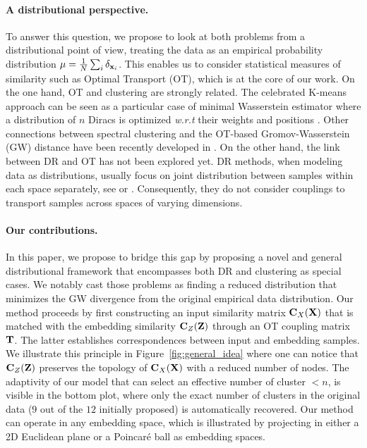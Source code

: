 \paragraph{A distributional perspective.} To answer this question, we
propose to look at both problems from a distributional point of view, treating the data as an empirical probability distribution
$\mu=\frac{1}{N}\sum_i\delta_{{\mathbf{x}}_i}$. 
This enables us to consider statistical measures of similarity such as Optimal Transport (OT), which is at the core of our work.
On the one hand, OT and clustering are strongly related.
The celebrated K-means approach can be seen as a particular case of minimal Wasserstein estimator where a distribution of $n$ Diracs is optimized \textit{w.r.t} their weights and positions \cite{Canas12}. Other connections between spectral clustering and the OT-based Gromov-Wasserstein (GW) distance have been recently developed in \citet{chowdhury2021generalized,chen2023gromov,vincent2021semi}. On the other hand, the link between DR and OT has not been explored yet. DR methods, when modeling data as distributions,
usually focus on joint distribution between samples within each space separately, see \eg \citet{van2023snekhorn} or \citet{lu2019doubly}.
Consequently, they do not consider couplings to transport samples across spaces of varying dimensions. %

\paragraph{Our contributions.} In this paper, we propose to bridge this gap by
proposing a novel and general distributional framework that encompasses both DR and clustering
as special cases. We notably cast those problems as finding a reduced distribution that minimizes the GW divergence from the original empirical data distribution.
Our method proceeds by first constructing an input similarity matrix
${\mathbf{C}}_X({\mathbf{X}})$ that is matched with the embedding similarity ${\mathbf{C}}_Z({\mathbf{Z}})$ through
an OT coupling matrix ${\mathbf{T}}$. The latter establishes correspondences between
input and embedding samples. We illustrate this principle in
Figure~\ref{fig:general_idea} where one can notice that ${\mathbf{C}}_Z({\mathbf{Z}})$ preserves
the topology of ${\mathbf{C}}_X({\mathbf{X}})$ with a reduced number of nodes. The adaptivity of
our model that can select an effective number of cluster $<n$, is visible in the
bottom plot, where only the exact number of clusters in the original data ($9$ out of the $12$
initially proposed) is automatically recovered. Our method can operate in any embedding space, which is illustrated by
projecting in either a 2D Euclidean plane or a Poincaré ball as embedding
spaces.

